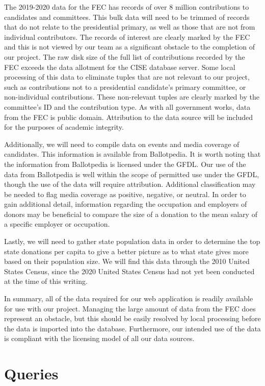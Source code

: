 \documentclass[12pt]{article}
\begin{document}
The 2019-2020 data for the FEC has records of over 8 million contributions to candidates and committees. This bulk data will need to be trimmed of records that do not relate to the presidential primary, as well as those that are not from individual contributors. The records of interest are clearly marked by the FEC and this is not viewed by our team as a significant obstacle to the completion of our project. The raw disk size of the full list of contributions recorded by the FEC exceeds the data allotment for the CISE database server. Some local processing of this data to eliminate tuples that are not relevant to our project, such as contributions not to a presidential candidate’s primary committee, or non-individual contributions. These non-relevant tuples are clearly marked by the committee's ID and the contribution type. As with all government works, data from the FEC is public domain. Attribution to the data source will be included for the purposes of academic integrity.
 
Additionally, we will need to compile data on events and media coverage of candidates. This information is available from Ballotpedia. It is worth noting that the information from Ballotpedia is licensed under the GFDL. Our use of the data from Ballotpedia is well within the scope of permitted use under the GFDL, though the use of the data will require attribution. Additional classification may be needed to flag media coverage as positive, negative, or neutral. In order to gain additional detail, information regarding the occupation and employers of donors may be beneficial to compare the size of a donation to the mean salary of a specific employer or occupation.

Lastly, we will need to gather state population data in order to determine the top state donations per capita to give a better picture as to what state gives more based on their population size. We will find this data through the 2010 United States Census, since the 2020 United States Census had not yet been conducted at the time of this writing.

In summary, all of  the data required for our web application is readily available for use with our project. Managing the large amount of data from the FEC does represent an obstacle, but this should be easily resolved by local processing before the data is imported into the database. Furthermore, our intended use of the data is compliant with the licensing model of all our data sources. 

\section{Queries}
\end{document}
